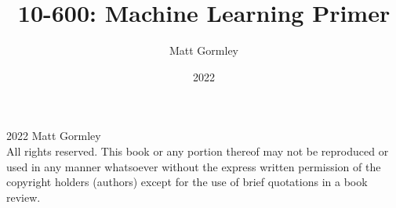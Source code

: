 \title{{10-600: \textbf{M}achine \textbf{L}earning \textbf{P}rimer}}
\author{Matt Gormley}
\date{2022}
\hypersetup{pageanchor=false} 
\maketitle

\parindent 0pt
\parskip \baselineskip
\textcopyright{} 2022 Matt Gormley
\\

All rights reserved.
This book or any portion thereof may not be reproduced or used in any
manner whatsoever without the express written permission of the
copyright holders (authors) except for the use of brief quotations in
a book review.

\tableofcontents
\hypersetup{pageanchor=true} 
